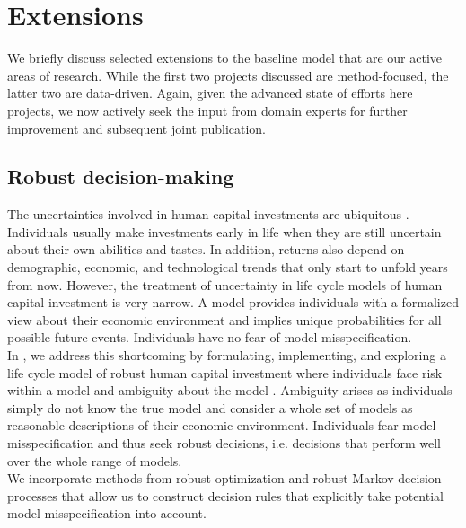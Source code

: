 \section{Extensions}\label{Extensions}
We briefly discuss selected extensions to the baseline model that are our active areas of research. While the first two projects discussed are method-focused, the latter two are data-driven. Again, given the advanced state of efforts here projects, we now actively seek the input from domain experts for further improvement and subsequent joint publication.
\subsection{Robust decision-making}
The uncertainties involved in human capital investments are ubiquitous \citep{Becker.1964}. Individuals usually make investments early in life when they are still uncertain about their own abilities and tastes. In addition, returns also depend on demographic, economic, and technological trends that only start to unfold years from now. However, the treatment of uncertainty in life cycle models of human capital investment is very narrow. A model provides individuals with a formalized view about their economic environment and implies unique probabilities for all possible future events. Individuals have no fear of model misspecification.\\

\noindent In \citet{Eisenhauer.2020}, we address this shortcoming by formulating, implementing, and exploring a life cycle model of robust human capital investment where individuals face risk within a model and ambiguity about the model \citep{Arrow.1951}. Ambiguity arises as individuals simply do not know the true model and consider a whole set of models as reasonable descriptions of their economic environment. Individuals fear model misspecification and thus seek robust decisions, i.e. decisions that perform well over the whole range of models.\\

\noindent We incorporate methods from robust optimization \citep{Ben-Tal.2009,Wiesemann.2014,Rahimian.2019} and robust Markov decision processes \citep{Iyengar.2005,Nilim.2005} that allow us to construct decision rules that explicitly take potential model misspecification into account.
